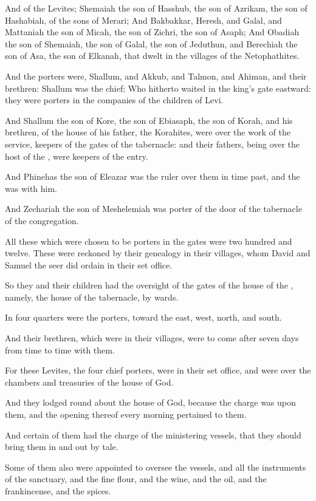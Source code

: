 \verse And of the Levites; Shemaiah the son of Hasshub, the son of Azrikam, the son of Hashabiah, of the sons of Merari; \verse And Bakbakkar, Heresh, and Galal, and Mattaniah the son of Micah, the son of Zichri, the son of Asaph; \verse And Obadiah the son of Shemaiah, the son of Galal, the son of Jeduthun, and Berechiah the son of Asa, the son of Elkanah, that dwelt in the villages of the Netophathites.

\verse And the porters were, Shallum, and Akkub, and Talmon, and Ahiman, and their brethren: Shallum was the chief; \verse Who hitherto waited in the king's gate eastward: they were porters in the companies of the children of Levi.

\verse And Shallum the son of Kore, the son of Ebiasaph, the son of Korah, and his brethren, of the house of his father, the Korahites, were over the work of the service, keepers of the gates of the tabernacle: and their fathers, being over the host of the \LORD, were keepers of the entry.

\verse And Phinehas the son of Eleazar was the ruler over them in time past, and the \LORD was with him.

\verse And Zechariah the son of Meshelemiah was porter of the door of the tabernacle of the congregation.

\verse All these which were chosen to be porters in the gates were two hundred and twelve. These were reckoned by their genealogy in their villages, whom David and Samuel the seer did ordain in their set office.

\verse So they and their children had the oversight of the gates of the house of the \LORD, namely, the house of the tabernacle, by wards.

\verse In four quarters were the porters, toward the east, west, north, and south.

\verse And their brethren, which were in their villages, were to come after seven days from time to time with them.

\verse For these Levites, the four chief porters, were in their set office, and were over the chambers and treasuries of the house of God.

\verse And they lodged round about the house of God, because the charge was upon them, and the opening thereof every morning pertained to them.

\verse And certain of them had the charge of the ministering vessels, that they should bring them in and out by tale.

\verse Some of them also were appointed to oversee the vessels, and all the instruments of the sanctuary, and the fine flour, and the wine, and the oil, and the frankincense, and the spices.

